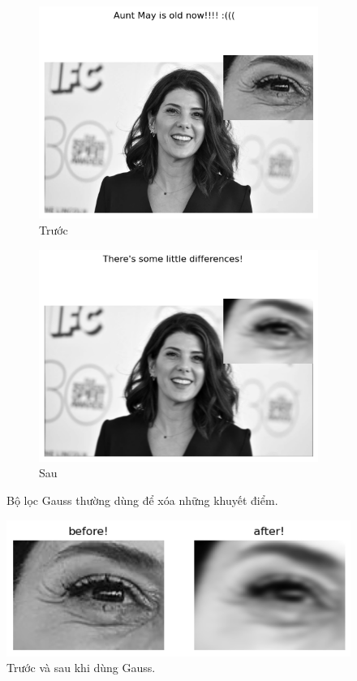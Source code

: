 \documentclass{article}
\begin{document}
        \begin{figure}[ht!]
            \centering
            \begin{subfigure}[b]{0.4\linewidth}
                \includegraphics[width=\linewidth]{fo13a.png}
                \caption{Trước}
            \end{subfigure}
            \begin{subfigure}[b]{0.4\linewidth}
                \includegraphics[width=\linewidth]{fo13b.png}
                \caption{Sau}
            \end{subfigure}
            \caption{Bộ lọc Gauss thường dùng để xóa những khuyết điểm.}
            \label{fig14}
        \end{figure}
        \begin{figure}[ht!]
        \centering
        \includegraphics[width = 0.8\linewidth]{fo14.png}
        \caption{Trước và sau khi dùng Gauss.}
        \label{fig15}
        \end{figure}
\end{document}
